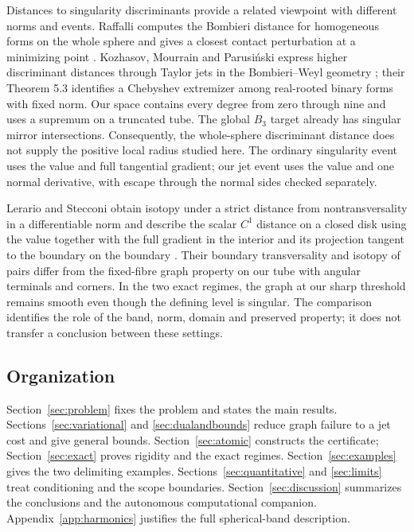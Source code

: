 \documentclass[11pt,a4paper]{article}
\begin{document}
Distances to singularity discriminants provide a related viewpoint
with different norms and events. Raffalli computes the Bombieri
distance for homogeneous forms on the whole sphere and gives a
closest contact perturbation at a minimizing point
\cite[Theorems 5.1 and 5.4]{Raffalli}.
Kozhasov, Mourrain and Parusi\'nski express higher discriminant
distances through Taylor jets in the Bombieri--Weyl geometry
\cite[Proposition 3.2, equations (3.8)--(3.9)]{KozhasovMourrainParusinski}; their
Theorem 5.3 identifies a Chebyshev extremizer among real-rooted binary
forms with fixed norm. Our space contains every degree from zero
through nine and uses a supremum on a truncated tube. The global
$B_3$ target already has singular mirror intersections. Consequently,
the whole-sphere discriminant distance does not supply the positive
local radius studied here. The ordinary singularity event uses the
value and full tangential gradient; our jet event uses the value and
one normal derivative, with escape through the normal sides checked
separately.

Lerario and Stecconi obtain isotopy under a strict distance from
nontransversality in a differentiable norm and describe the scalar
$C^1$ distance on a closed disk using the value together with the full gradient in the interior
and its projection tangent to the boundary on the boundary
\cite[Lemma 20 and Proposition 31]{LerarioStecconi}.
Their boundary transversality and isotopy of pairs differ from the
fixed-fibre graph property on our tube with angular terminals and
corners. In the two exact regimes, the graph at our sharp threshold remains
smooth even though the defining level is singular. The comparison
identifies the role of the band, norm, domain and preserved property;
it does not transfer a conclusion between these settings.

\subsection{Organization}

Section~\ref{sec:problem} fixes the problem and states the main results.
Sections~\ref{sec:variational} and \ref{sec:dualandbounds} reduce
graph failure to a jet cost and give general bounds.
Section~\ref{sec:atomic} constructs the certificate; Section~\ref{sec:exact}
proves rigidity and the exact regimes. Section~\ref{sec:examples}
gives the two delimiting examples. Sections~\ref{sec:quantitative}
and \ref{sec:limits} treat conditioning and the scope boundaries.
Section~\ref{sec:discussion} summarizes the conclusions and the
autonomous computational companion. Appendix~\ref{app:harmonics}
justifies the full spherical-band description.
\end{document}
